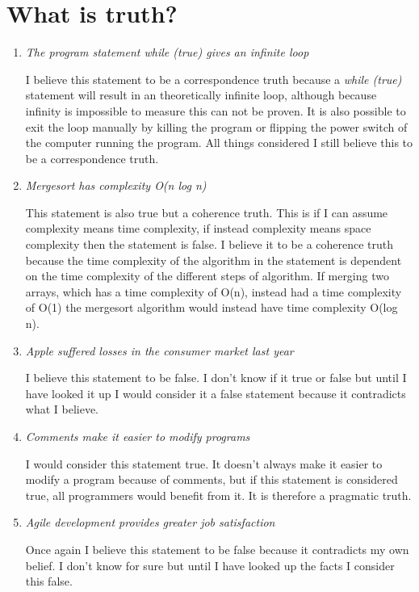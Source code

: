 \documentclass[11pt,a4paper]{article}
\begin{document}
\section{What is truth?}
\begin{enumerate}
	\item \textit{The program statement while (true) {} gives an infinite loop}

	I believe this statement to be a correspondence truth because a \textit{while (true) {}} statement will result in an theoretically infinite loop, 
	although because infinity is impossible to measure this can not be proven. It is also possible to exit the loop manually by killing the program or 
	flipping the power switch of the computer running the program. All things considered I still believe this to be a correspondence truth.

	\item \textit{Mergesort has complexity O(n log n)}

	This statement is also true but a coherence truth. This is if I can assume complexity means time complexity, if instead complexity means space complexity 
	then the statement is false. I believe it to be a coherence truth because the time complexity of the algorithm in the statement is dependent on the 
	time complexity of the different steps of algorithm. If merging two arrays, which has a time complexity of O(n), instead had a time complexity of O(1) 
	the mergesort algorithm would instead have time complexity O(log n).

	\item \textit{Apple suffered losses in the consumer market last year}
	
	I believe this statement to be false. I don't know if it true or false but until I have looked it up I would consider it a false statement because it 
	contradicts what I believe.

	\item \textit{Comments make it easier to modify programs}
	
	I would consider this statement true. It doesn't always make it easier to modify a program because of comments, but if this statement is considered true, 
	all programmers would benefit from it. It is therefore a pragmatic truth.

	\item \textit{Agile development provides greater job satisfaction}

	Once again I believe this statement to be false because it contradicts my own belief. I don't know for sure but until I have looked up the facts I consider
	this false.


\end{enumerate}
\end{document}
